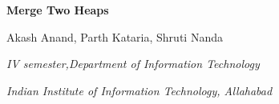 \documentclass[12pt]{article}
\renewcommand{\_}{\kern-1.5pt\textunderscore\kern-1.5pt}
\begin{document}
\begin{adjustwidth}{-0.25in}{-0.44in}
\begin{Center}
{\fontsize{14pt}{16.8pt}\selectfont \textbf{Merge Two Heaps }\par}
\end{Center}\par

\end{adjustwidth}

\begin{Center}
Akash Anand, Parth Kataria, Shruti Nanda
\end{Center}\par

\par

\begin{Center}
\textit{IV semester,Department of Information Technology}
\end{Center}\par

\begin{Center}
\textit{Indian Institute of Information Technology, Allahabad}
\end{Center}\par
\end{document}
